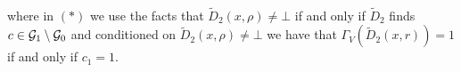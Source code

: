 \begin{align*}
\end{align*}
where in $(*)$ we use the facts that $\widetilde{D}_2(x,\rho) \neq \bot$ if and only if $\widetilde{D}_2$ finds $c \in \mathcal{G}_1 \setminus \mathcal{G}_0$
and conditioned on $\widetilde{D}_2(x,\rho) \neq \bot$  we have that $\Gamma_V(\widetilde{D}_2(x,r)) = 1$ if and only if $c_1 = 1$.